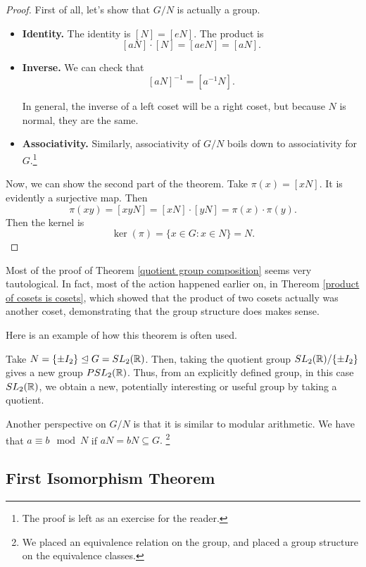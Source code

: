 \begin{proof}

First of all, let's show that $G/N$ is actually a group.
\begin{itemize}
    \item \textbf{Identity.} The identity is $[N] = [eN]$. The product is 
    \[
    [aN] \cdot [N] = [aeN] = [aN].
    \]
    
    \item \textbf{Inverse.} 
    We can check that
    \[
    [aN]^{-1} = [a^{-1}N].
    \]
    
    In general, the inverse of a left coset will be a right coset, but because $N$ is normal, they are the same.  
    
    \item \textbf{Associativity.} Similarly, associativity of $G/N$ boils down to associativity for $G.$\footnote{The proof is left as an exercise for the reader.}
\end{itemize}

Now, we can show the second part of the theorem. Take $\pi(x) = [xN]$. It is evidently a surjective map. Then 
\[
\pi(xy) = [xyN] = [xN] \cdot [yN] = \pi(x) \cdot \pi(y).
\]
Then the kernel is 
\[
\ker(\pi) = \{x \in G : x \in N\} = N.
\]

\end{proof}

Most of the proof of Theorem \ref{quotient group composition} seems very tautological. In fact, most of the action happened earlier on, in Thereom \ref{product of cosets is cosets}, which showed that the product of two cosets actually was another coset, demonstrating that the group structure does makes sense.

Here is an example of how this theorem is often used. 
\begin{example}
Take $N = \{\pm I_2\} \trianglelefteq G = SL_2(\mathbb R)$. Then, taking the quotient group $SL_2(\mathbb R) / \{\pm I_2\}$ gives a new group $PSL_2(\mathbb R)$.  Thus, from an explicitly defined group, in this case $SL_2(\mathbb R)$, we obtain a new, potentially interesting or useful group by taking a quotient.
\end{example}

Another perspective on $G/N$ is that it is similar to modular arithmetic. We have that $a \equiv b \mod N$ if $aN = bN \subseteq G.$ \footnote{We placed an equivalence relation on the group, and placed a group structure on the equivalence classes.}

\subsection{First Isomorphism Theorem}

